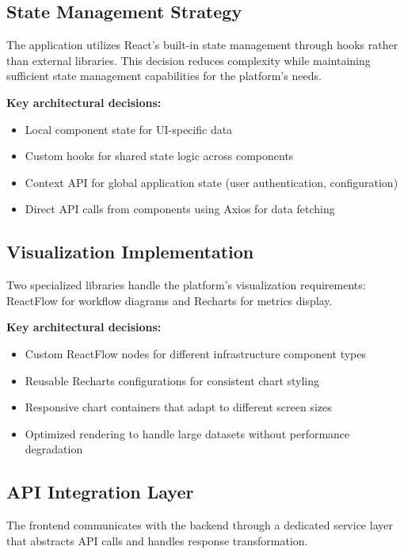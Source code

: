 \subsection{State Management Strategy}

The application utilizes React's built-in state management through hooks rather than external libraries. This decision reduces complexity while maintaining sufficient state management capabilities for the platform's needs.

\textbf{Key architectural decisions:}
\begin{itemize}
    \item Local component state for UI-specific data
    \item Custom hooks for shared state logic across components
    \item Context API for global application state (user authentication, configuration)
    \item Direct API calls from components using Axios for data fetching
\end{itemize}

\subsection{Visualization Implementation}

Two specialized libraries handle the platform's visualization requirements: ReactFlow for workflow diagrams and Recharts for metrics display.

\textbf{Key architectural decisions:}
\begin{itemize}
    \item Custom ReactFlow nodes for different infrastructure component types
    \item Reusable Recharts configurations for consistent chart styling
    \item Responsive chart containers that adapt to different screen sizes
    \item Optimized rendering to handle large datasets without performance degradation
\end{itemize}

\subsection{API Integration Layer}

The frontend communicates with the backend through a dedicated service layer that abstracts API calls and handles response transformation.

